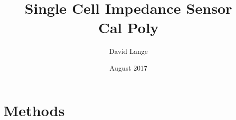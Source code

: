 \documentclass[12pt]{report}
\title{
        {Single Cell Impedance Sensor}\\
        {\large Cal Poly}
}
\author{David Lange}
\date{August 2017}
\begin{document}


%

%

%

\tableofcontents

\listoffigures

\listoftables

\doublespacing

%
\newpage
{}





%

%

\chapter{Methods}


%

% 

%

\singlespacing
\printbibliography
\end{document}
